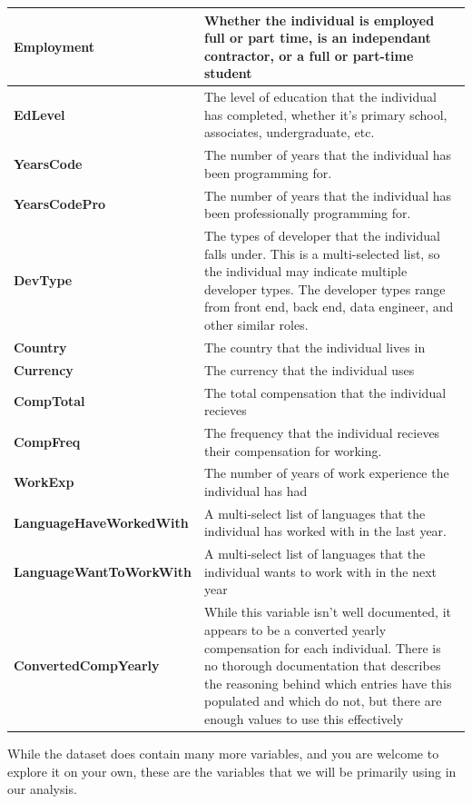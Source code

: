 \documentclass{report}
\begin{document}
\begin{longtable}{| p{} | p{} |}
\hline
\textbf{Employment} & Whether the individual is employed full or part time, is an independant contractor, or a full or part-time student \\ \hline
\textbf{EdLevel} & The level of education that the individual has completed, whether it's primary school, associates, undergraduate, etc. \\ \hline
\textbf{YearsCode}& The number of years that the individual has been programming for. \\ \hline
\textbf{YearsCodePro} & The number of years that the individual has been professionally programming for. \\ \hline
\textbf{DevType} & The types of developer that the individual falls under. This is a multi-selected list, so the individual may indicate multiple developer types. The developer types range from front end, back end, data engineer, and other similar roles. \\ \hline
\textbf{Country} & The country that the individual lives in \\ \hline
\textbf{Currency} & The currency that the individual uses \\ \hline
\textbf{CompTotal} & The total compensation that the individual recieves \\ \hline
\textbf{CompFreq} & The frequency that the individual recieves their compensation for working. \\ \hline
\textbf{WorkExp} & The number of years of work experience the individual has had \\ \hline
\textbf{LanguageHaveWorkedWith} & A multi-select list of languages that the individual has worked with in the last year. \\ \hline
\textbf{LanguageWantToWorkWith} & A multi-select list of languages that the individual wants to work with in the next year \\ \hline
\textbf{ConvertedCompYearly} & While this variable isn't well documented, it appears to be a converted yearly compensation for each individual. There is no thorough documentation that describes the reasoning behind which entries have this populated and which do not, but there are enough values to use this effectively \\ \hline
\end{longtable}

While the dataset does contain many more variables, and you are welcome to explore it on your own, these are the variables that we will be primarily using in our analysis.
\end{document}
